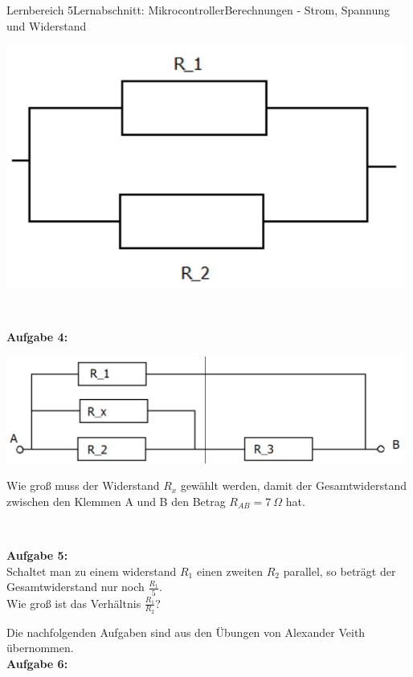 \documentclass[oneside,openany,headings=optiontotoc,11pt,numbers=noenddot]{scrreprt}
\begin{document}
\begin{worksheet}{Lernbereich 5}{Lernabschnitt: Mikrocontroller}{Berechnungen - Strom, Spannung und Widerstand}
\begin{framed}
\begin{minipage}{0.38\textwidth}
					\includegraphics[width=0.98\textwidth]{../99_Bilder/A3.png}
				\end{minipage}\\
				\par\noindent
				\textbf{Aufgabe 4:}\\
				\begin{minipage}{0.58\textwidth}
					\includegraphics[width=0.98\textwidth]{../99_Bilder/A4.png}
				\end{minipage}
				\hfill
				\begin{minipage}{0.38\textwidth}
					Wie groß muss der Widerstand \(R_x\) gewählt werden, damit der Gesamtwiderstand zwischen den Klemmen A und B den Betrag \(R_{AB} = 7\ \Omega\) hat.
				\end{minipage}\\
				\par\noindent
				\textbf{Aufgabe 5:}\\
				Schaltet man zu einem widerstand \(R_1\) einen zweiten \(R_2\) parallel, so beträgt der Gesamtwiderstand nur noch \(\frac{R_1}{5}\).\\
				Wie groß ist das Verhältnis \(\frac{R_1}{R_2}\)?\\
				\par\noindent
				\tiny{Die nachfolgenden Aufgaben sind aus den Übungen von Alexander Veith übernommen.}\normalsize\\
				\textbf{Aufgabe 6:}\\

\end{framed}
\end{worksheet}
\end{document}
